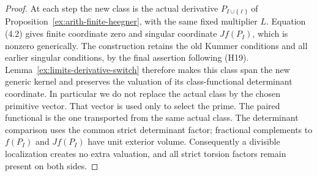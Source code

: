 \documentclass[11pt]{article}
\theoremstyle{definition}
\theoremstyle{remark}
\begin{document}
\begin{proof}
At each step the new class is the actual derivative
$P_{I\cup\{\ell\}}$ of Proposition~\ref{ex:arith-finite-heegner},
with the same fixed multiplier $L$. Equation (4.2) gives finite
coordinate zero and singular coordinate $Jf(P_I)$, which is nonzero
generically. The construction retains the old Kummer conditions and
all earlier singular conditions, by the final assertion following
(H19). Lemma~\ref{ex:limits-derivative-switch} therefore makes this
class span the new generic kernel and preserves the valuation of
its class-functional determinant coordinate. In particular we do
not replace the actual class by the chosen primitive vector.
That vector is used only to select the prime. The paired functional
is the one transported from the same actual class. The determinant
comparison uses the common strict determinant factor; fractional
complements to $f(P_I)$ and $Jf(P_I)$ have unit exterior volume.
Consequently a divisible localization creates no extra valuation,
and all strict torsion factors remain present on both sides.


\end{proof}
\end{document}
